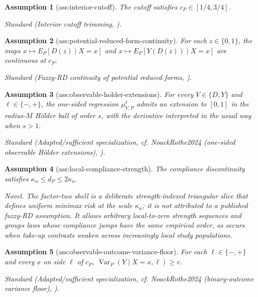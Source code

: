 \documentclass{article}
\newtheorem{assumption}{Assumption}
\begin{document}
\begin{assumption}[ass:interior-cutoff]\label{ass:interior-cutoff}
The cutoff satisfies \(c_P\in[1/4,3/4]\).
\par\smallskip\noindent\emph{Standard} (Interior cutoff trimming, \cite{PorterYu2015}).
\end{assumption}

\begin{assumption}[ass:potential-reduced-form-continuity]\label{ass:potential-reduced-form-continuity}
For each \(z\in\{0,1\}\), the maps \(x\mapsto E_P[D(z)\mid X=x]\) and \(x\mapsto E_P[Y(D(z))\mid X=x]\) are continuous at \(c_P\).
\par\smallskip\noindent\emph{Standard} (Fuzzy-RD continuity of potential reduced forms, \cite{HahnToddVanDerKlaauw2001}).
\end{assumption}

\begin{assumption}[ass:observable-holder-extensions]\label{ass:observable-holder-extensions}
For every \(V\in\{D,Y\}\) and \(\ell\in\{-,+\}\), the one-sided regression \(\mu_{V,P}^{\ell}\) admits an extension to \([0,1]\) in the radius-\(M\) H\"older ball of order \(s\), with the derivative interpreted in the usual way when \(s>1\).
\par\smallskip\noindent\emph{Standard} (Adapted/sufficient specialization, cf. NoackRothe2024 (one-sided observable H{\"o}lder extensions), \cite{NoackRothe2024}).
\end{assumption}

\begin{assumption}[ass:local-compliance-strength]\label{ass:local-compliance-strength}
The compliance discontinuity satisfies \(\kappa_n\le d_P\le2\kappa_n\).
\par\smallskip\noindent\emph{Novel.} The factor-two shell is a deliberate strength-indexed triangular slice that defines uniform minimax risk at the scale \(\kappa_n\); it is not attributed to a published fuzzy-RD assumption. It allows arbitrary local-to-zero strength sequences and groups laws whose compliance jumps have the same empirical order, as occurs when take-up contrasts weaken across increasingly local study populations.
\end{assumption}

\begin{assumption}[ass:observable-outcome-variance-floor]\label{ass:observable-outcome-variance-floor}
For each \(\ell\in\{-,+\}\) and every \(x\) on side \(\ell\) of \(c_P\), \(\operatorname{Var}_P(Y\mid X=x,\ell)\ge v\).
\par\smallskip\noindent\emph{Standard} (Adapted/sufficient specialization, cf. NoackRothe2024 (binary-outcome variance floor), \cite{NoackRothe2024}).
\end{assumption}
\end{document}
